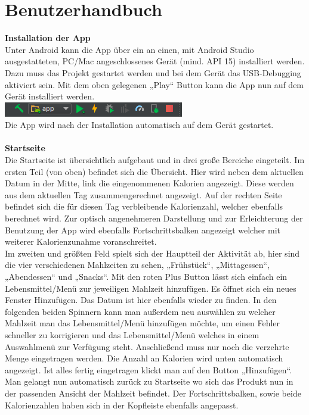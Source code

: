 \section{Benutzerhandbuch}
\label{concept}


\textbf{Installation der App} \\
Unter Android kann die App über ein an einen, mit Android Studio ausgestatteten, PC/Mac angeschlossenes Gerät (mind. API 15) installiert werden. Dazu muss das Projekt gestartet werden und bei dem Gerät das USB-Debugging aktiviert sein. Mit dem oben gelegenen „Play“ Button kann die App nun auf dem Gerät installiert werden.\\
\includegraphics[scale=1]{img/androidstudio.jpg}\\
Die App wird nach der Installation automatisch auf dem Gerät gestartet.\\
\\
\textbf{Startseite} \\
Die Startseite ist übersichtlich aufgebaut und in drei große Bereiche eingeteilt. Im ersten Teil (von oben) befindet sich die Übersicht. Hier wird neben dem aktuellen Datum in der Mitte, link die eingenommenen Kalorien angezeigt. Diese werden aus dem aktuellen Tag zusammengerechnet angezeigt. Auf der rechten Seite befindet sich die für diesen Tag verbleibende Kalorienzahl, welcher ebenfalls berechnet wird. Zur optisch angenehmeren Darstellung und zur Erleichterung der Benutzung der App wird ebenfalls Fortschrittsbalken angezeigt welcher mit weiterer Kalorienzunahme voranschreitet. \\
Im zweiten und größten Feld spielt sich der Hauptteil der Aktivität ab, hier sind die vier verschiedenen Mahlzeiten zu sehen, „Frühstück“, „Mittagessen“, „Abendessen“ und „Snacks“. Mit den roten Plus Button lässt sich einfach ein Lebensmittel/Menü zur jeweiligen Mahlzeit hinzufügen. Es öffnet sich ein neues Fenster Hinzufügen. Das Datum ist hier ebenfalls wieder zu finden. In den folgenden beiden Spinnern kann man außerdem neu auswählen zu welcher Mahlzeit man das Lebensmittel/Menü hinzufügen möchte, um einen Fehler schneller zu korrigieren und das Lebensmittel/Menü welches in einem Auswahlmenü zur Verfügung steht. Anschließend muss nur noch die verzehrte Menge eingetragen werden. Die Anzahl an Kalorien wird unten automatisch angezeigt. Ist alles fertig eingetragen klickt man auf den Button „Hinzufügen“. Man gelangt nun automatisch zurück zu Startseite wo sich das Produkt nun in der passenden Ansicht der Mahlzeit befindet. Der Fortschrittsbalken, sowie beide Kalorienzahlen haben sich in der Kopfleiste ebenfalls angepasst.\\
